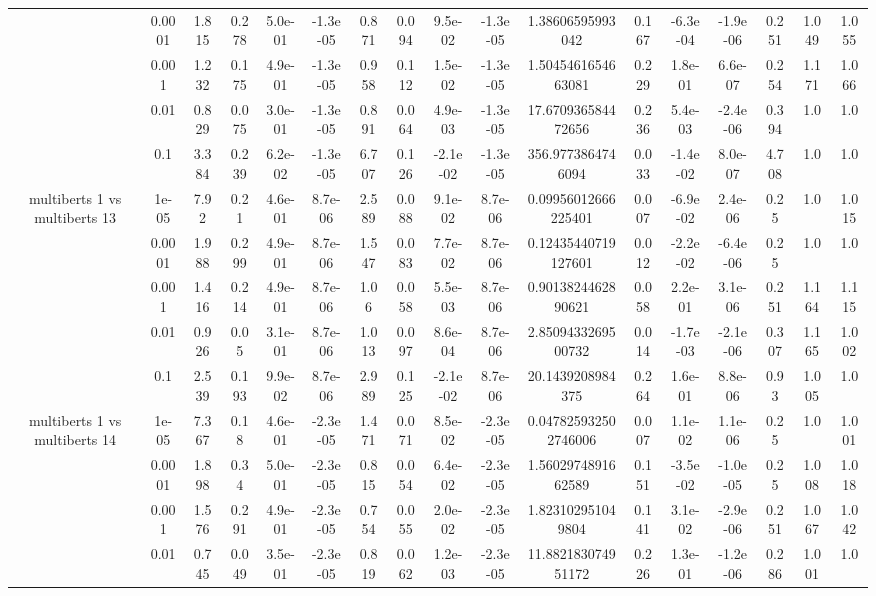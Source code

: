 \begin{tabular}{|c|c|c|c|c|c|c|c|c|c|c|c|c|c|c|c|c|}
 & 0.0001 & 1.815 & 0.278 & 5.0e-01 & -1.3e-05 & 0.871 & 0.094 & 9.5e-02 & -1.3e-05 & 1.38606595993042 & 0.167 & -6.3e-04 & -1.9e-06 & 0.251 & 1.049 & 1.055 \\
 & 0.001 & 1.232 & 0.175 & 4.9e-01 & -1.3e-05 & 0.958 & 0.112 & 1.5e-02 & -1.3e-05 & 1.5045461654663081 & 0.229 & 1.8e-01 & 6.6e-07 & 0.254 & 1.171 & 1.066 \\
 & 0.01 & 0.829 & 0.075 & 3.0e-01 & -1.3e-05 & 0.891 & 0.064 & 4.9e-03 & -1.3e-05 & 17.670936584472656 & 0.236 & 5.4e-03 & -2.4e-06 & 0.394 & 1.0 & 1.0 \\
 & 0.1 & 3.384 & 0.239 & 6.2e-02 & -1.3e-05 & 6.707 & 0.126 & -2.1e-02 & -1.3e-05 & 356.9773864746094 & 0.033 & -1.4e-02 & 8.0e-07 & 4.708 & 1.0 & 1.0 \\
\hline
\multirow{5}{*}{multiberts 1 vs multiberts 13} & 1e-05 & 7.92 & 0.21 & 4.6e-01 & 8.7e-06 & 2.589 & 0.088 & 9.1e-02 & 8.7e-06 & 0.09956012666225401 & 0.007 & -6.9e-02 & 2.4e-06 & 0.25 & 1.0 & 1.015 \\
 & 0.0001 & 1.988 & 0.299 & 4.9e-01 & 8.7e-06 & 1.547 & 0.083 & 7.7e-02 & 8.7e-06 & 0.12435440719127601 & 0.012 & -2.2e-02 & -6.4e-06 & 0.25 & 1.0 & 1.0 \\
 & 0.001 & 1.416 & 0.214 & 4.9e-01 & 8.7e-06 & 1.06 & 0.058 & 5.5e-03 & 8.7e-06 & 0.9013824462890621 & 0.058 & 2.2e-01 & 3.1e-06 & 0.251 & 1.164 & 1.115 \\
 & 0.01 & 0.926 & 0.05 & 3.1e-01 & 8.7e-06 & 1.013 & 0.097 & 8.6e-04 & 8.7e-06 & 2.8509433269500732 & 0.014 & -1.7e-03 & -2.1e-06 & 0.307 & 1.165 & 1.002 \\
 & 0.1 & 2.539 & 0.193 & 9.9e-02 & 8.7e-06 & 2.989 & 0.125 & -2.1e-02 & 8.7e-06 & 20.1439208984375 & 0.264 & 1.6e-01 & 8.8e-06 & 0.93 & 1.005 & 1.0 \\
\hline
\multirow{5}{*}{multiberts 1 vs multiberts 14} & 1e-05 & 7.367 & 0.18 & 4.6e-01 & -2.3e-05 & 1.471 & 0.071 & 8.5e-02 & -2.3e-05 & 0.047825932502746006 & 0.007 & 1.1e-02 & 1.1e-06 & 0.25 & 1.0 & 1.001 \\
 & 0.0001 & 1.898 & 0.34 & 5.0e-01 & -2.3e-05 & 0.815 & 0.054 & 6.4e-02 & -2.3e-05 & 1.5602974891662589 & 0.151 & -3.5e-02 & -1.0e-05 & 0.25 & 1.008 & 1.018 \\
 & 0.001 & 1.576 & 0.291 & 4.9e-01 & -2.3e-05 & 0.754 & 0.055 & 2.0e-02 & -2.3e-05 & 1.823102951049804 & 0.141 & 3.1e-02 & -2.9e-06 & 0.251 & 1.067 & 1.042 \\
 & 0.01 & 0.745 & 0.049 & 3.5e-01 & -2.3e-05 & 0.819 & 0.062 & 1.2e-03 & -2.3e-05 & 11.882183074951172 & 0.226 & 1.3e-01 & -1.2e-06 & 0.286 & 1.001 & 1.0 \\

\end{tabular}
